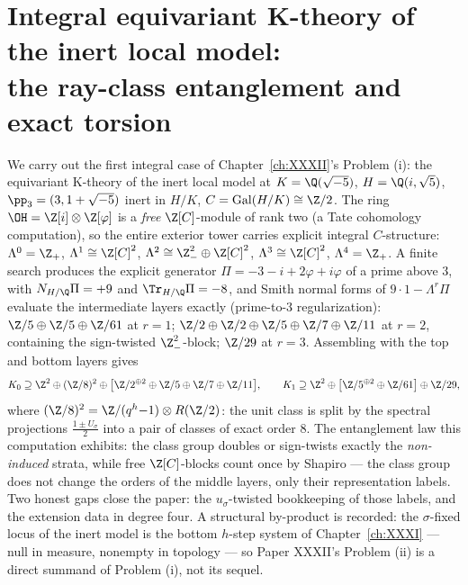 \chapter[Integral equivariant K-theory of the inert model]{Integral equivariant K-theory of the inert local model:\\ the ray-class entanglement and exact torsion}\label{ch:XXXVIII}
\renewcommand{\Ns}{N}
\begin{summary}
We carry out the first integral case of Chapter~\ref{ch:XXXII}'s Problem (i): the equivariant
K-theory of the inert local model at $K=\Q(\sqrt{-5})$, $H=\Q(i,\sqrt5)$,
$\pp_3=(3,1+\sqrt{-5})$ inert in $H/K$, $C=\mathrm{Gal}(H/K)\cong\Z/2$. The ring
$\OH=\Z[i]\otimes\Z[\varphi]$ is a \emph{free} $\Z[C]$-module of rank two (a Tate
cohomology computation), so the entire exterior tower carries explicit integral
$C$-structure: $\Lambda^0=\Z_+$, $\Lambda^1\cong\Z[C]^2$,
$\Lambda^2\cong\Z_-^2\oplus\Z[C]^2$, $\Lambda^3\cong\Z[C]^2$, $\Lambda^4=\Z_+$. A finite
search produces the explicit generator $\Pi=-3-i+2\varphi+i\varphi$ of a prime above
$3$, with $\Ns_{H/\Q}\Pi=+9$ and $\Tr_{H/\Q}\Pi=-8$, and Smith normal forms of
$9\cdot1-\Lambda^r\Pi$ evaluate the intermediate layers exactly (prime-to-$3$
regularization): $\Z/5\oplus\Z/5\oplus\Z/61$ at $r=1$;
$\Z/2\oplus\Z/2\oplus\Z/5\oplus\Z/7\oplus\Z/11$ at $r=2$, containing the sign-twisted
$\Z_-^2$-block; $\Z/29$ at $r=3$. Assembling with the top and bottom layers gives
\[
K_0\supseteq\Z^2\oplus(\Z/8)^2\oplus\bigl[\Z/2^{\oplus2}\oplus\Z/5\oplus\Z/7\oplus\Z/11\bigr],
\qquad
K_1\supseteq\Z^2\oplus\bigl[\Z/5^{\oplus2}\oplus\Z/61\bigr]\oplus\Z/29,
\]
where $(\Z/8)^2=\Z/(q^h{-}1)\otimes R(\Z/2)$: the unit class is split by the spectral
projections $\tfrac{1\pm U_\sigma}2$ into a pair of classes of exact order $8$. The
entanglement law this computation exhibits: the class group doubles or sign-twists
exactly the \emph{non-induced} strata, while free $\Z[C]$-blocks count once by Shapiro
--- the class group does not change the orders of the middle layers, only their
representation labels. Two honest gaps close the paper: the $u_\sigma$-twisted
bookkeeping of those labels, and the extension data in degree four. A structural
by-product is recorded: the $\sigma$-fixed locus of the inert model is the bottom
$h$-step system of Chapter~\ref{ch:XXXI} --- null in measure, nonempty in topology --- so Paper
XXXII's Problem (ii) is a direct summand of Problem (i), not its sequel.
\end{summary}


